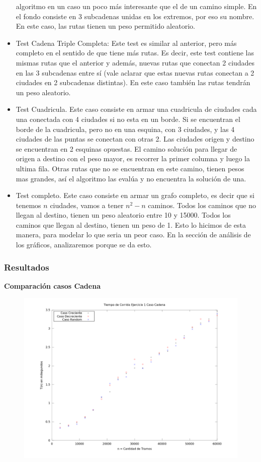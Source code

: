 \begin{itemize}
algoritmo en un caso un poco
más
interesante que el de un camino simple. En el fondo consiste en 3 subcadenas
unidas en los extremos, por eso
su nombre. En este caso, las rutas tienen un peso permitido aleatorio.
  \item Test Cadena Triple Completa: Este test es similar al anterior, pero más
completo en el sentido de que
tiene
más rutas. Es decir, este test contiene las mismas rutas que el anterior y
además, nuevas rutas que conectan
2 ciudades en las 3 subcadenas entre sí (vale aclarar que estas nuevas rutas
conectan a 2 ciudades en 2
subcadenas distintas). En este caso también las rutas tendrán un peso aleatorio.
  \item Test Cuadricula. Este caso consiste en armar una cuadricula de ciudades
cada una conectada con 4 ciudades si no esta en un borde. Si se encuentran el
borde de la cuadricula, pero no en una esquina, con 3 ciudades, y las 4 ciudades
de las puntas se conectan con otras 2. Las ciudades origen y destino se
encuentran en 2 esquinas opuestas. El camino solución para llegar de origen a
destino con el peso mayor, es recorrer la primer columna y luego la ultima
fila. Otras rutas que no se encuentran en este camino, tienen pesos mas grandes,
así el algoritmo las evalúa y no encuentra la solución de una. 
  \item Test completo. Este caso consiste en armar un grafo completo, es decir
que si tenemos $n$ ciudades, vamos a tener $n^2-n$ caminos. Todos los caminos
que no llegan al destino, tienen un peso aleatorio entre 10 y 15000. Todos los
caminos que llegan al destino, tienen un peso de 1. Esto lo hicimos de esta
manera, para modelar lo que seria un peor caso. En la sección de análisis de los
gráficos, analizaremos porque se da esto.
\end{itemize}

\clearpage

\subsubsection{Resultados}

\textbf{Comparación casos Cadena}

\begin{figure}[h]
	\centering
	\includegraphics[width=450px]{./figs/cadenas.png}
\end{figure}

